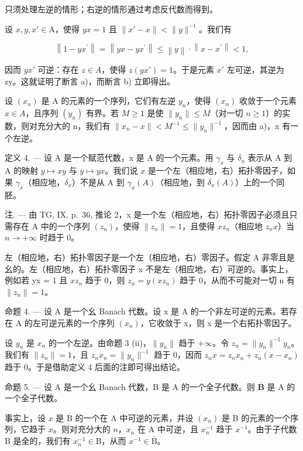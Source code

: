 只须处理左逆的情形；右逆的情形通过考虑反代数而得到。

设 \(x, y, x' \in \mathrm{A}\)，使得 \(yx = 1\) 且 \(\|x' - x\| < \|y\|^{-1}\)。我们有

\[
\left\| 1 - y x ^ {\prime} \right\| = \left\| y x - y x ^ {\prime} \right\| \leqslant \left\| y \right\| \cdot \left\| x - x ^ {\prime} \right\| <   1,
\]

因而 \(yx'\) 可逆：存在 \(z \in A\)，使得 \(z(yx') = 1\)。于是元素 \(x'\) 左可逆，其逆为 zy。这就证明了断言 a)，而断言 b) 立即得出。

  设 \((x_{n})\) 是 A 的元素的一个序列，它们有左逆 \(y_{n}\)，使得 \((x_{n})\) 收敛于一个元素 \(x \in A\)，且序列 \((y_{n})\) 有界。若 \(M \geqslant 1\) 是使 \(\|y_{n}\| \leqslant M\)（对一切 \(n \geqslant 1\)）的实数，则对充分大的 n，我们有 \(\|x_{n} - x\| < M^{-1} \leqslant \|y_{n}\|^{-1}\)，因而由 a)，x 有一个左逆。

定义 4. --- 设 A 是一个赋范代数，x 是 A 的一个元素。用 \(\gamma_x\) 与 \(\delta_x\) 表示从 A 到 A 的映射 \(y \mapsto xy\) 与 \(y \mapsto yx\)。我们说 \(x\) 是一个左（相应地，右）拓扑零因子，如果 \(\gamma_x\)（相应地，\(\delta_x\)）不是从 A 到 \(\gamma_x(A)\)（相应地，到 \(\delta_x(A)\)）上的一个同胚。

注. --- 由 TG, IX, p.~36, 推论 2，x 是一个左（相应地，右）拓扑零因子必须且只需存在 A 中的一个序列 \((z_{n})\)，使得 \(\|z_{n}\|=1\)，且使得 \(xz_{n}\)（相应地 \(z_{n}x\)）当 \(n\to+\infty\) 时趋于 0。

左（相应地，右）拓扑零因子是一个左（相应地，右）零因子。假定 A 非零且是幺的。左（相应地，右）拓扑零因子 x 不是左（相应地，右）可逆的。事实上，例如若 yx = 1 且 \(xz_{n}\) 趋于 0，则 \(z_{n} = y(xz_{n})\) 趋于 0，从而不可能对一切 n 有 \(\|z_{n}\| = 1\)。

命题 4. --- 设 A 是一个幺 Banach 代数。设 x 是 A 的一个非左可逆的元素。若存在 A 的左可逆元素的一个序列 \((x_{n})\)，它收敛于 x，则 x 是一个右拓扑零因子。

设 \(y_{n}\) 是 \(x_{n}\) 的一个左逆。由命题 3 (ii)，\(\|y_{n}\|\) 趋于 \(+\infty\)。令 \(z_{n} = \|y_{n}\|^{-1}y_{n}\)。我们有 \(\|z_{n}\| = 1\)，且 \(z_{n}x_{n} = \|y_{n}\|^{-1}\) 趋于 0，因而 \(z_{n}x = z_{n}x_{n} + z_{n}(x - x_{n})\) 趋于 0。于是借助定义 4 后面的注即可得出结论。

命题 5. --- 设 A 是一个幺 Banach 代数，B 是 A 的一个全子代数。则 \(\overline{\mathbf{B}}\) 是 A 的一个全子代数。

事实上，设 \(x\) 是 \(\overline{\mathrm{B}}\) 的一个在 A 中可逆的元素，并设 \((x_n)\) 是 B 的元素的一个序列，它趋于 \(x\)。则对充分大的 \(n\)，\(x_n\) 在 A 中可逆，且 \(x_n^{-1}\) 趋于 \(x^{-1}\)。由于子代数 B 是全的，我们有 \(x_n^{-1} \in \mathrm{B}\)，从而 \(x^{-1} \in \overline{\mathrm{B}}\)。

